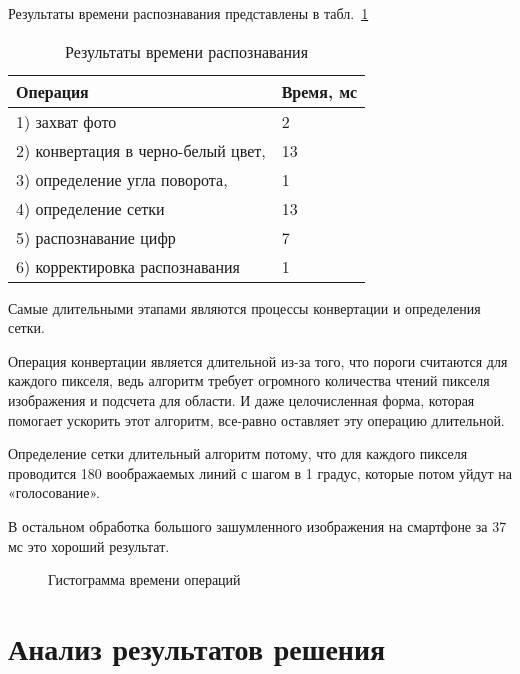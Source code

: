 Результаты времени распознавания представлены в табл.~\ref{tab:tres}
\begin{table}[ht]
  \caption{Результаты времени распознавания}
  \begin{tabular}{|p{9cm}|p{5.5cm}|}
  \hline
  Операция & Время, мс \\
  \hline
  1) захват фото & 2\\
  \hline
  2) конвертация в черно-белый цвет, & 13 \\
  \hline
  3) определение угла поворота, & 1 \\
  \hline
  4) определение сетки &  13 \\
  \hline
  5) распознавание цифр & 7 \\
  \hline
  6) корректировка распознавания &  1\\
  \hline
  \end{tabular}
  \label{tab:tres}
\end{table}

Самые длительными этапами являются процессы конвертации и определения сетки.

Операция конвертации является длительной из-за того, что пороги считаются для каждого пикселя, ведь алгоритм требует огромного количества чтений пикселя изображения и подсчета для области. И даже целочисленная форма, которая помогает ускорить этот алгоритм, все-равно оставляет эту операцию длительной.

Определение сетки длительный алгоритм потому, что для каждого пикселя проводится 180 воображаемых линий с шагом в 1 градус, которые потом уйдут на «голосование».

В остальном обработка большого зашумленного изображения на смартфоне за 37 мс это хороший результат.

\begin{figure}[ht]
 \centering
 \caption{Гистограмма времени операций}
 \label{fig:ChDD}
\end{figure}

\section{Анализ результатов решения}

